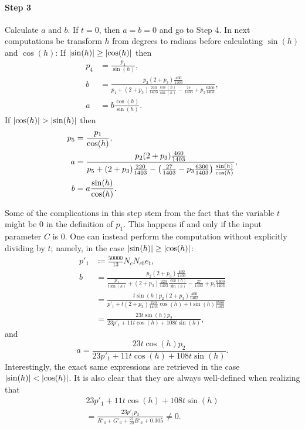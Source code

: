 \documentclass[twocolumn]{scrartcl}
\theoremstyle{named}
\DeclarePairedDelimiter\abs{\lvert}{\rvert}%
\begin{document}
\paragraph{Step 3}{Calculate $a$ and $b$.
If $t=0$, then $a=b=0$ and go to Step 4.
In next computations be transform $h$ from degrees to radians
before calculating $\sin(h)$ and $\cos(h)$:
If $\abs{\sin(h)} \ge \abs{\cos(h)}$ then
\begin{align*}
  p_4 &= \frac{p_1}{\sin(h)},\\
  b &= \frac{p_2 (2+p_3) \frac{460}{1403}}{p_4 + (2+p_3) \frac{220}{1403} \frac{\cos(h)}{\sin(h)} - \frac{27}{1403} + p_3 \frac{6300}{1403}},\\
  a &= b \frac{\cos(h)}{\sin(h)}.
\end{align*}
If $\abs{\cos(h)} > \abs{\sin(h)}$ then
\begin{align*}
  p_5 &= \frac{p_1}{\cos(h)},\\
  a &= \frac{p_2 (2+p_3) \frac{460}{1403}}{%
    p_5
    + (2+p_3) \frac{220}{1403} -
    \left(\frac{27}{1403}  - p_3 \frac{6300}{1403}\right) \frac{\sin(h)}{\cos(h)}
  },\\
  b &= a \frac{\sin(h)}{\cos(h)}.
\end{align*}}

Some of the complications in this step stem from the fact that the variable $t$
might be $0$ in the definition of $p_1$. This happens if and only if the input
parameter $C$ is $0$.
One can instead perform the computation without explicitly dividing by $t$;
namely, in the case $\abs{\sin(h)} \ge \abs{\cos(h)}$:
\begin{align*}
  p'_1 &\coloneqq \frac{50000}{13} N_c N_{cb} e_t,\\
  b &= \frac{p_2 (2+p_3) \frac{460}{1403}}{\frac{p'_1}{t\sin(h)} + (2+p_3) \frac{220}{1403} \frac{\cos(h)}{\sin(h)} - \frac{27}{1403} + p_3 \frac{6300}{1403}}\\
   &= \frac{t \sin(h) p_2 (2+p_3) \frac{460}{1403}}{p'_1 + t (2+p_3) \frac{220}{1403} \cos(h) + t \sin(h) \frac{6588}{1403}}\\
   &= \frac{23 t \sin(h) p_2}{23 p'_1 + 11 t \cos(h) + 108 t \sin(h)},
\end{align*}
and
\[
  a = \frac{23 t \cos(h) p_2}{23 p'_1 + 11 t \cos(h) + 108 t \sin(h)}.
\]
Interestingly, the exact same expressions are retrieved in the case
$\abs{\sin(h)} < \abs{\cos(h)}$.
It is also clear that they are always well-defined when realizing that
\begin{multline*}
  23 p'_1 + 11 t \cos(h) + 108 t \sin(h)\\
  = \frac{23 p'_1 p_2}{R'_a + G'_a + \tfrac{21}{20}B'_a + 0.305}
  \neq 0.
\end{multline*}
\end{document}
